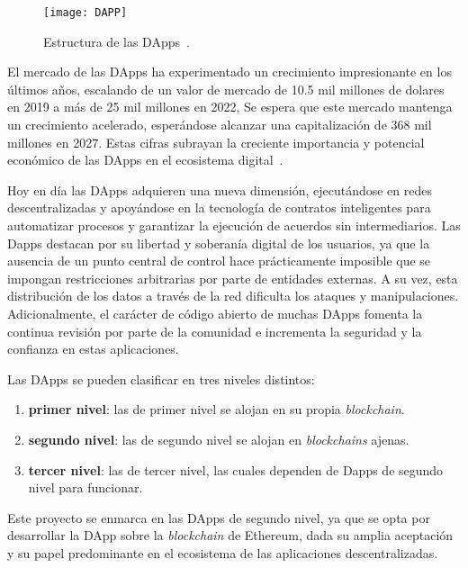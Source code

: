 \begin{figure}[h]
	\label{img:DAPP}
	\centering
	\texttt{[image: DAPP]}
	\caption[Estructura de las DApps]{Estructura de las DApps~\cite{dAppDiagrama}.}
\end{figure}

El mercado de las DApps ha experimentado un crecimiento impresionante en los últimos años, escalando de un valor de mercado de 10.5 mil millones de dolares en 2019 a más de 25 mil millones en 2022, Se espera que este mercado mantenga un crecimiento acelerado, esperándose alcanzar una capitalización de 368 mil millones en 2027. Estas cifras subrayan la creciente importancia y potencial económico de las DApps en el ecosistema digital~\cite{DAppsEconomía}.

Hoy en día las DApps adquieren una nueva dimensión, ejecutándose en redes descentralizadas y apoyándose en la tecnología de contratos inteligentes para automatizar procesos y garantizar la ejecución de acuerdos sin intermediarios.
Las Dapps destacan por su libertad y soberanía digital de los usuarios, ya que la ausencia de un punto central de control hace prácticamente imposible que se impongan restricciones arbitrarias por parte de entidades externas. A su vez, esta distribución de los datos a través de la red dificulta los ataques y manipulaciones.
Adicionalmente, el carácter de código abierto de muchas DApps fomenta la continua revisión por parte de la comunidad e incrementa la seguridad y la confianza en estas aplicaciones.

Las DApps se pueden clasificar en tres niveles distintos: 

\begin{enumerate}
\item \textbf{primer nivel}: las de primer nivel se alojan en su propia \textit{blockchain}.

\item \textbf{segundo nivel}: las de segundo nivel se alojan en \textit{blockchains} ajenas.

\item \textbf{tercer nivel}: las de tercer nivel, las cuales dependen de Dapps de segundo nivel para funcionar.
\end{enumerate}

Este proyecto se enmarca en las DApps de segundo nivel, ya que se opta por desarrollar la DApp sobre la \textit{blockchain} de Ethereum, dada su amplia aceptación y su papel predominante en el ecosistema de las aplicaciones descentralizadas.


